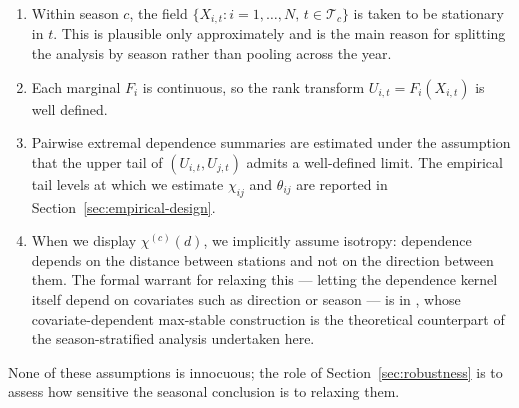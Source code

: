 \begin{enumerate}
    \item Within season \(c\), the field \(\{X_{i,t}: i=1,\dots,N,\,
          t\in\mathcal{T}_c\}\) is taken to be stationary in \(t\).
          This is plausible only approximately and is the main
          reason for splitting the analysis by season rather than
          pooling across the year.
    \item Each marginal \(F_i\) is continuous, so the rank transform
          \(U_{i,t} = F_i(X_{i,t})\) is well defined.
    \item Pairwise extremal dependence summaries are estimated
          under the assumption that the upper tail of
          \((U_{i,t},U_{j,t})\) admits a well-defined limit. The
          empirical tail levels at which we estimate \(\chi_{ij}\)
          and \(\theta_{ij}\) are reported in
          Section~\ref{sec:empirical-design}.
    \item When we display \(\chi^{(c)}(d)\), we implicitly assume
          isotropy: dependence depends on the distance between
          stations and not on the direction between them. The
          formal warrant for relaxing this — letting the dependence
          kernel itself depend on covariates such as direction or
          season — is in \citet{TODO-huser-genton2016}, whose
          covariate-dependent max-stable construction is the
          theoretical counterpart of the season-stratified analysis
          undertaken here.
\end{enumerate}

None of these assumptions is innocuous; the role of
Section~\ref{sec:robustness} is to assess how sensitive the seasonal
conclusion is to relaxing them.
